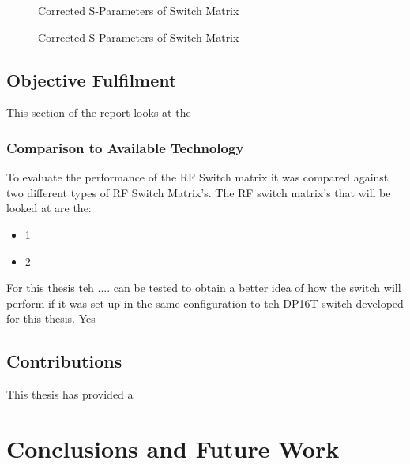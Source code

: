 \documentclass[12pt,openany,a4paper]{book}
\begin{document}
\begin{figure}[H]
	\centering
	\caption{Corrected S-Parameters of Switch Matrix}
	\label{fig:corrected-switchmatrix}
\end{figure}  
\begin{figure}[H]
	\centering
	\caption{Corrected S-Parameters of Switch Matrix}
	\label{fig:corrected-switchmatrix}
\end{figure} 







\section{Objective Fulfilment}
This section of the report looks at the 

\subsection{Comparison to Available Technology}
To evaluate the performance of the RF Switch matrix it was compared against two different types of RF Switch Matrix's. The RF switch matrix's that will be looked at are the:
\begin{itemize}
	\setlength\itemsep{-0.5em}
	\item 1
	\item 2
\end{itemize}
For this thesis teh .... can be tested to obtain a better idea of how the switch will perform if it was set-up in the same configuration to teh DP16T switch developed for this thesis. Yes

\section{Contributions}
This thesis has provided a 













\chapter{Conclusions and Future Work}
\end{document}
